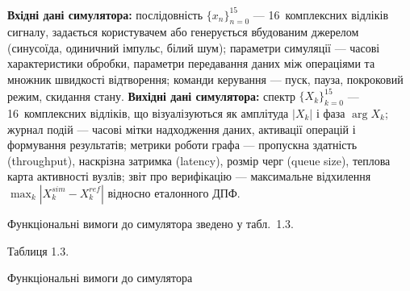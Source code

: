 \textbf{Вхідні дані симулятора:} послідовність
\(\{ x_{n}\}_{n = 0}^{15}\) --- 16~комплексних відліків сигналу,
задається користувачем або генерується вбудованим джерелом (синусоїда,
одиничний імпульс, білий шум); параметри симуляції --- часові
характеристики обробки, параметри передавання даних між операціями та
множник швидкості відтворення; команди керування --- пуск, пауза,
покроковий режим, скидання стану. \textbf{Вихідні дані симулятора:}
спектр \(\{ X_{k}\}_{k = 0}^{15}\) --- 16~комплексних відліків, що
візуалізуються як амплітуда \(|X_{k}|\) і фаза \(\arg X_{k}\); журнал
подій --- часові мітки надходження даних, активації операцій і
формування результатів; метрики роботи графа --- пропускна здатність
(throughput), наскрізна затримка (latency), розмір черг (queue size),
теплова карта активності вузлів; звіт про верифікацію --- максимальне
відхилення \(\max_{k}|X_{k}^{sim} - X_{k}^{ref}|\) відносно еталонного
ДПФ.

Функціональні вимоги до симулятора зведено у табл.~1.3.

Таблиця 1.3.

Функціональні вимоги до симулятора

